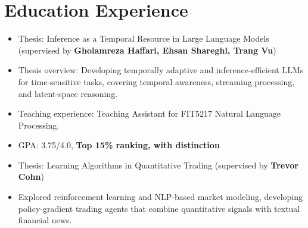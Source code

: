 \documentclass{resume_en_tm}
\begin{document}
\section{Education Experience}
\begin{itemize}
    \item Thesis: Inference as a Temporal Resource in Large Language Models \\(supervised by \textbf{Gholamreza Haffari, Ehsan Shareghi, Trang Vu})
    \item Thesis overview: Developing temporally adaptive and inference-efficient LLMs for time-sensitive tasks, covering temporal awareness, streaming processing, and latent-space reasoning.
    \item Teaching experience: Teaching Assistant for FIT5217 Natural Language Processing.
\end{itemize}

\begin{itemize}
    \item GPA: 3.75/4.0, \textbf{Top 15\% ranking, with distinction}
    \item Thesis: Learning Algorithms in Quantitative Trading (supervised by \textbf{Trevor Cohn})
    \item Explored reinforcement learning and NLP-based market modeling, developing policy-gradient trading agents that combine quantitative signals with textual financial news.
\end{itemize}

\end{document}
